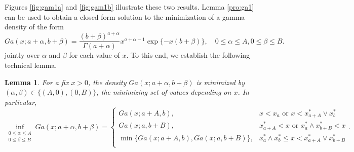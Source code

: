 \documentclass[12pt]{article}
\newtheorem{lemma}{Lemma}[section]
\begin{document}
	Figures \ref{fig:gam1a} and \ref{fig:gam1b} illustrate these two results. Lemma \ref{pro:ga1} can be used to obtain a closed form solution to the minimization of a gamma density of the form
	\begin{equation}
		\label{eq:ga}
		Ga(x;a+\alpha,b+\beta) = \frac{(b+\beta)^{a+\alpha}}{\Gamma(a+\alpha)}x^{a+\alpha-1}\exp\{-x(b+\beta)\}, \quad 0\le\alpha\le A, 0\le\beta\le B.
	\end{equation}
	jointly over $\alpha$ and $\beta$ for each value of $x$. To this end, we establish the following technical lemma.
	\begin{lemma}	
		\label{pro:ga2}
		For a fix $x>0$, the density $Ga(x;a+\alpha,b+\beta)$ is minimized by $(\alpha, \beta) \in \{(A, 0), (0, B)\}$, the minimizing set of values depending on $x$. In particular,	
		$$\inf_{\begin{aligned}
				0\le \alpha\le A \\ 0\le \beta\le B
		\end{aligned}}Ga(x;a+\alpha,b+\beta) = 
		\begin{cases}
			Ga(x;a+A,b)                     , & x<x_a         \text{ or } x<x_{a+A}^* \vee x_b^*\\
			Ga(x;a,b+B)                     , & x_{a+A}^* < x \text{ or } x_a^* \wedge x_{b+B}^* < x\\
			\min\{Ga(x;a+A,b), Ga(x;a,b+B)\}, & x_a^* \wedge x_b^*\le x < x_{a+A}^* \vee x_{b+B}^*\\
		\end{cases}.$$
	\end{lemma}
	
\end{document}
